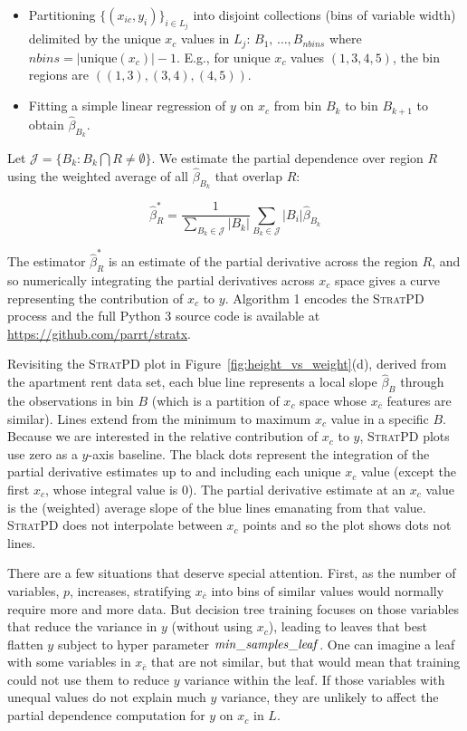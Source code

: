 \documentclass[12pt]{article}
\newcommand{\figref}[1]{Figure~\ref{#1}}
\newcommand{\spd}{\fontfamily{cmr}\textsc{\small StratPD}}
\newcommand{\xnc}{$x_{\overline{c}}$}
\begin{document}
\begin{itemize}
	\item Partitioning $\{(x_{ic}, y_i)\}_{i \in L_j}$ into disjoint collections (bins of variable width) delimited by the unique $x_c$ values in $L_j$: $B_1, \,\ldots, B_{nbins}$  where $nbins = |\text{unique}(x_c)|-1$. E.g., for unique $x_c$ values $(1,3,4,5)$, the bin regions are $((1,3), (3,4), (4,5))$.
	\item Fitting a simple linear regression of $y$ on $x_c$ from bin $B_k$ to bin $B_{k+1}$ to obtain  $\widehat{\beta}_{B_k}$.
\end{itemize}

Let $\mathcal{J} = \{B_k: B_k \bigcap R \neq \emptyset\}$. We estimate the partial dependence over region $R$ using the weighted average of all $\widehat{\beta}_{B_k}$ that overlap $R$:

\begin{equation}\label{eq:slope}
\widehat{\beta}^{*}_R = \frac{1}{\displaystyle\sum_{B_k \in \mathcal{J}} |B_k|}\displaystyle\sum_{B_k \in \mathcal{J}}|B_i|\widehat{\beta}_{B_k}
\end{equation}

The estimator $\widehat{\beta}^{*}_R$ is an estimate of the partial derivative across the region $R$, and so numerically integrating the partial derivatives across $x_c$ space gives a curve representing the contribution of $x_c$ to $y$.  Algorithm 1 encodes the \spd{} process and the full Python 3 source code is available at {\small \url{https://github.com/parrt/stratx}}. 

Revisiting the \spd{} plot in \figref{fig:height_vs_weight}(d), derived from the apartment rent data set, each blue line represents a local slope $\hat{\beta}_B$ through the observations in bin $B$ (which is a partition of $x_c$ space whose \xnc{} features are similar). Lines extend from the minimum to maximum $x_c$ value in a specific $B$.  Because we are interested in the relative contribution of $x_c$ to $y$, \spd{} plots use zero as a $y$-axis baseline. The black dots represent the integration of the partial derivative estimates up to and including each unique $x_c$ value (except the first $x_c$, whose integral value is 0). The partial derivative estimate at an $x_c$ value is the (weighted) average slope of the blue lines emanating from that value. \spd{} does not interpolate between $x_c$ points and so the plot shows dots not lines. 

There are a few situations that deserve special attention. First, as the number of  variables, $p$, increases, stratifying \xnc{} into bins of similar values would normally require more and more data. But decision tree training focuses on those variables that reduce the variance in $y$ (without using $x_c$), leading to leaves that best flatten $y$ subject to hyper parameter ${\it min\_samples\_leaf}$. One can imagine a leaf with some variables in \xnc{} that are not similar, but that would mean that training could not use them to reduce $y$ variance within the leaf. If those variables with unequal values do not explain much $y$ variance, they are unlikely to affect the partial dependence computation for $y$ on $x_c$ in $L$.
\end{document}

